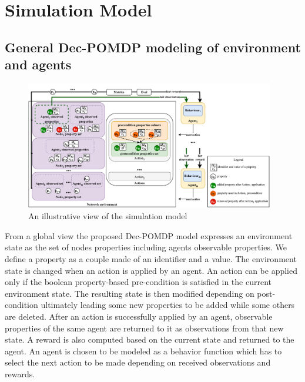 \documentclass[conference]{IEEEtran}
\newcommand{\rem}[1]{\textcolor{red}{#1}}
\begin{document}
\section{Simulation Model}

\subsection{General Dec-POMDP modeling of environment and agents}


\begin{figure}[]
    \centering
    \includegraphics[width=0.97\textwidth]{figures/model_example_illustration.pdf}
    \caption{An illustrative view of the simulation model}
    \label{fig:model_example_illustration}
\end{figure}

\noindent
From a global view the proposed Dec-POMDP model expresses an environment state as the set of nodes properties including agents observable properties. We define a property as a couple made of an identifier and a value. The environment state is changed when an action is applied by an agent. An action can be applied only if the boolean property-based pre-condition is satisfied in the current environment state. The resulting state is then modified depending on post-condition ultimately leading some new properties to be added while some others are deleted. After an action is successfully applied by an agent, observable properties of the same agent are returned to it as observations from that new state. A reward is also computed based on the current state and returned to the agent. An agent is chosen to be modeled as a behavior function which has to select the next action to be made depending on received observations and rewards.
\end{document}
